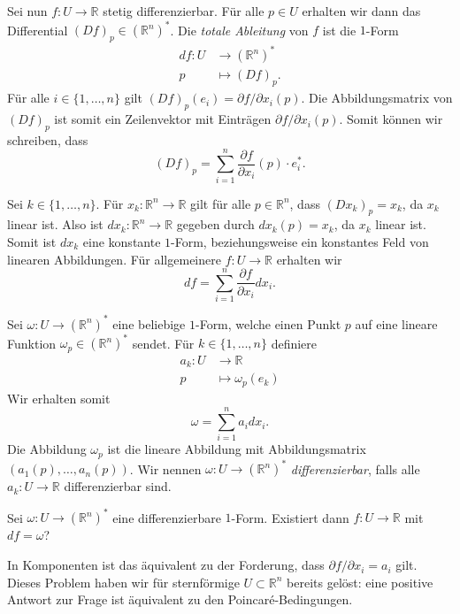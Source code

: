 \documentclass[../main.tex]{subfiles}
\begin{document}
Sei nun $f \colon U \to \mathbb{R}$
stetig differenzierbar.
Für alle $p \in U$ erhalten wir dann das Differential
${(Df)}_p \in {(\mathbb{R}^n)}^*$.
Die \emph{totale Ableitung} von $f$ ist die $1$-Form
\begin{align*}
  df \colon U & \to {(\mathbb{R}^n)}^* \\
  p & \mapsto {(Df)}_p.
\end{align*}
Für alle $i \in \{1, \dots, n\}$ gilt
${(Df)}_p(e_i) = \partial f / \partial x_i (p)$.
Die Abbildungsmatrix von ${(Df)}_p$ ist somit ein Zeilenvektor mit
Einträgen $\partial f/ \partial x_i (p)$.
Somit können wir schreiben, dass
\[
  {(Df)}_p =
  \sum_{i=1}^{n} \frac{\partial f}{\partial x_i}(p) \cdot e_i^*.
\]

Sei $k \in \{1, \dots, n\}$.
Für $x_k \colon \mathbb{R}^n \to \mathbb{R}$ gilt
für alle $p \in \mathbb{R}^n$, dass
${(Dx_k)}_p = x_k$, da $x_k$ linear ist.
Also ist $dx_k \colon \mathbb{R}^n \to \mathbb{R}$
gegeben durch $dx_k(p) = x_k$, da $x_k$ linear ist.
Somit ist $dx_k$ eine konstante $1$-Form,
beziehungsweise ein konstantes Feld von linearen Abbildungen.
Für allgemeinere $f \colon U \to \mathbb{R}$
erhalten wir
\[
  df = \sum_{i=1}^{n} \frac{\partial f}{\partial x_i} dx_i.
\]

Sei $\omega \colon U \to {(\mathbb{R}^n)}^*$ eine beliebige $1$-Form,
welche einen Punkt $p$ auf eine lineare Funktion $\omega_p
\in {(\mathbb{R}^n)}^*$ sendet.
Für $k \in \{1, \dots, n\}$ definiere
\begin{align*}
  a_k \colon U & \to \mathbb{R} \\
  p & \mapsto \omega_p(e_k)
\end{align*}
Wir erhalten somit
\[
  \omega = \sum_{i=1}^{n} a_i dx_i.
\]
Die Abbildung $\omega_p$ ist die lineare Abbildung
mit Abbildungsmatrix $(a_1(p), \dots, a_n(p))$.
Wir nennen  $\omega \colon U \to {(\mathbb{R}^n)}^*$
\emph{differenzierbar}, falls alle
$a_k \colon U \to \mathbb{R}$ differenzierbar sind.

\begin{question}
  Sei $\omega \colon U \to {(\mathbb{R}^n)}^*$ eine
  differenzierbare $1$-Form.
  Existiert dann $f \colon U \to \mathbb{R}$ mit
  $df = \omega$?
\end{question}

In Komponenten ist das äquivalent zu der Forderung,
dass
$\partial f / \partial x_i = a_i$
gilt.
Dieses Problem haben wir für sternförmige
$U \subset \mathbb{R}^n$ bereits gelöst:
eine positive Antwort zur Frage ist äquivalent zu
den Poincaré-Bedingungen.
\end{document}
